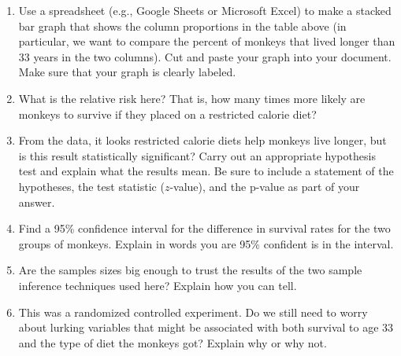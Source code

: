 \documentclass[12pt]{article}
\begin{document}
\begin{enumerate}

\item Use a spreadsheet (e.g., Google Sheets or Microsoft Excel) to make a stacked bar graph that shows the column proportions in the table above (in particular, we want to compare the percent of monkeys that lived longer than 33 years in the two columns).
Cut and paste your graph into your document. Make sure that your graph is clearly labeled.

\item What is the relative risk here? That is, how many times more likely are monkeys to survive if they placed on a restricted calorie diet? 

\item From the data, it looks restricted calorie diets help monkeys live longer, but is this result statistically significant? Carry out an appropriate hypothesis test and explain what the results mean.  Be sure to include a statement of the hypotheses, the test statistic ($z$-value), and the p-value as part of your answer.  

\item Find a 95\% confidence interval for the difference in survival rates for the two groups of monkeys. Explain in words you are 95\% confident is in the interval. 

\item Are the samples sizes big enough to trust the results of the two sample inference techniques used here?  Explain how you can tell.  

\item This was a randomized controlled experiment. Do we still need to worry about lurking variables that might be associated with both survival to age 33 and the type of diet the monkeys got? Explain why or why not.  

\end{enumerate}
\end{document}
